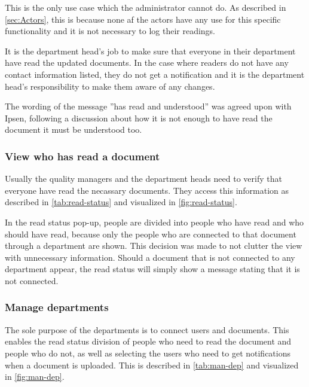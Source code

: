 


This is the only use case which the administrator cannot do.
As described in \cref{sec:Actors}, this is because none af the actors have any use for this specific functionality and it is not necessary to log their readings.

It is the department head's job to make sure that everyone in their department have read the updated documents.
In the case where readers do not have any contact information listed, they do not get a notification and it is the department head's responsibility to make them aware of any changes.

The wording of the message ''has read and understood'' was agreed upon with Ipsen, following a discussion about how it is not enough to have read the document it must be understood too.

\subsubsection{View who has read a document}
Usually the quality managers and the department heads need to verify that everyone have read the necassary documents.
They access this information as described in \cref{tab:read-status} and visualized in \cref{fig:read-status}.




In the read status pop-up, people are divided into people who have read and who should have read, because only the people who are connected to that document through a department are shown.
This decision was made to not clutter the view with unnecessary information.
Should a document that is not connected to any department appear, the read status will simply show a message stating that it is not connected.

\subsubsection{Manage departments}\label{managedepartments}
The sole purpose of the departments is to connect users and documents.
This enables the read status division of people who need to read the document and people who do not, as well as selecting the users who need to get notifications when a document is uploaded.
This is described in \cref{tab:man-dep} and visualized in \cref{fig:man-dep}.

